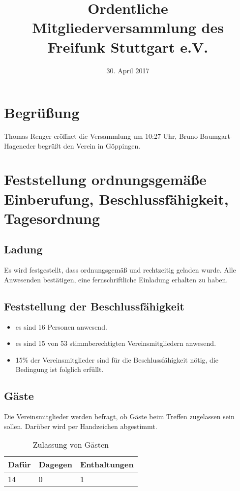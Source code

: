 \documentclass[a4paper]{scrartcl}
\date{30. April 2017}
\title{Ordentliche Mitgliederversammlung des Freifunk Stuttgart e.V.}
\begin{document}
\maketitle

\tableofcontents

\clearpage

\listoftables

\clearpage

\section{Begrüßung}
Thomas Renger eröffnet die Versammlung um 10:27 Uhr, Bruno Baumgart-Hageneder begrüßt den Verein in Göppingen.

\section{Feststellung ordnungsgemäße Einberufung, Beschlussfähigkeit, Tagesordnung}
\subsection{Ladung}
Es wird festgestellt, dass ordnungsgemäß und rechtzeitig geladen wurde. Alle Anwesenden bestätigen, eine fernschriftliche Einladung erhalten zu haben.

\subsection{Feststellung der Beschlussfähigkeit}
\begin{itemize}
\item es sind 16 Personen anwesend.
\item es sind 15 von 53 stimmberechtigten Vereinsmitgliedern anwesend.
\item 15\% der Vereinsmitglieder sind für die Beschlussfähigkeit nötig, die Bedingung ist folglich erfüllt.
\end{itemize}
\subsection{Gäste} 
Die Vereinsmitglieder werden befragt, ob Gäste beim Treffen zugelassen sein sollen. Darüber wird per Handzeichen abgestimmt.
\begin{table}[H]
	\begin{tabularx}{\textwidth}{XXX}
		Dafür & Dagegen & Enthaltungen\\
		\toprule
		14 & 0 & 1\\
	\end{tabularx}
	\caption{Zulassung von Gästen}
\end{table}
\end{document}

